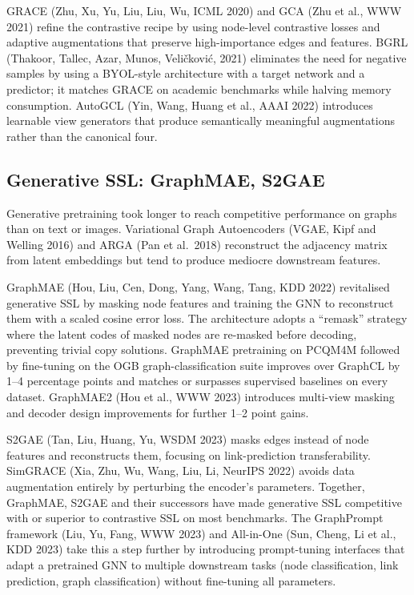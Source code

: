 GRACE (Zhu, Xu, Yu, Liu, Liu, Wu, ICML 2020) and GCA (Zhu et al., WWW 2021) refine the contrastive recipe by using node-level contrastive losses and adaptive augmentations that preserve high-importance edges and features. BGRL (Thakoor, Tallec, Azar, Munos, Veličković, 2021) eliminates the need for negative samples by using a BYOL-style architecture with a target network and a predictor; it matches GRACE on academic benchmarks while halving memory consumption. AutoGCL (Yin, Wang, Huang et al., AAAI 2022) introduces learnable view generators that produce semantically meaningful augmentations rather than the canonical four.

\subsection{Generative SSL: GraphMAE, S2GAE}\label{generative-ssl-graphmae-s2gae}

Generative pretraining took longer to reach competitive performance on graphs than on text or images. Variational Graph Autoencoders (VGAE, Kipf and Welling 2016) and ARGA (Pan et al.~2018) reconstruct the adjacency matrix from latent embeddings but tend to produce mediocre downstream features.

GraphMAE (Hou, Liu, Cen, Dong, Yang, Wang, Tang, KDD 2022) revitalised generative SSL by masking node features and training the GNN to reconstruct them with a scaled cosine error loss. The architecture adopts a ``remask'' strategy where the latent codes of masked nodes are re-masked before decoding, preventing trivial copy solutions. GraphMAE pretraining on PCQM4M followed by fine-tuning on the OGB graph-classification suite improves over GraphCL by 1--4 percentage points and matches or surpasses supervised baselines on every dataset. GraphMAE2 (Hou et al., WWW 2023) introduces multi-view masking and decoder design improvements for further 1--2 point gains.

S2GAE (Tan, Liu, Huang, Yu, WSDM 2023) masks edges instead of node features and reconstructs them, focusing on link-prediction transferability. SimGRACE (Xia, Zhu, Wu, Wang, Liu, Li, NeurIPS 2022) avoids data augmentation entirely by perturbing the encoder's parameters. Together, GraphMAE, S2GAE and their successors have made generative SSL competitive with or superior to contrastive SSL on most benchmarks. The GraphPrompt framework (Liu, Yu, Fang, WWW 2023) and All-in-One (Sun, Cheng, Li et al., KDD 2023) take this a step further by introducing prompt-tuning interfaces that adapt a pretrained GNN to multiple downstream tasks (node classification, link prediction, graph classification) without fine-tuning all parameters.


